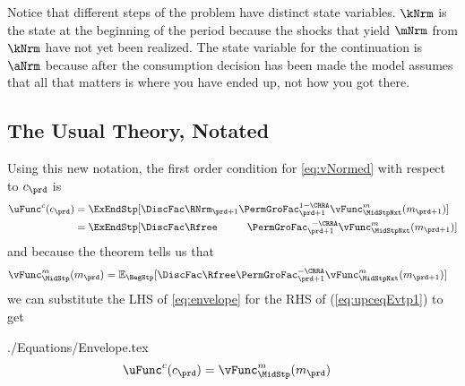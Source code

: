 \documentclass[SolvingMicroDSOPs]{subfiles}
\begin{document}
Notice that different steps of the problem have distinct state variables.  $\kNrm$ is the state at the beginning of the period because the shocks that yield $\mNrm$ from $\kNrm$ have not yet been realized. The state variable for the continuation {\move} is $\aNrm$ because after the consumption decision has been made the model assumes that all that matters is where you have ended up, not how you got there.

\subsection{The Usual Theory, Notated}

Using this new notation, the first order condition for \eqref{eq:vNormed} with respect to ${c}_{\prd}$ is
\begin{equation}\begin{gathered}\begin{aligned}
      \uFunc^{{c}}({c}_{\prd})  & = \ExEndStp[\DiscFac \RNrm_{\prd+1}\PermGroFac_{\prd+1}^{1-\CRRA}{\vFunc}^{{m}}_{\MidStpNxt}({m}_{\prd+1})]  \label{eq:upceqEvtp1}
      \\                        & =  \ExEndStp[\DiscFac\Rfree\phantom{._{\prd+1}}\PermGroFac_{\prd+1}^{\phantom{1}-\CRRA}{\vFunc}^{{m}}_{\MidStpNxt}({m}_{\prd+1})]
    \end{aligned}\end{gathered}\end{equation}
and because the  theorem tells us that
\begin{equation}\begin{gathered}\begin{aligned}
      {\vFunc}^{{m}}_{\MidStp}({m}_{\prd})  & =  \Ex_{\BegStp} [\DiscFac\Rfree\PermGroFac_{\prd+1}^{-\CRRA}{\vFunc}^{{m}}_{\MidStpNxt}({m}_{\prd+1})] \label{eq:envelope}
    \end{aligned}\end{gathered}\end{equation}
we can substitute the LHS of \eqref{eq:envelope} for the RHS of
(\ref{eq:upceqEvtp1}) to get
\begin{verbatimwrite}{./Equations/Envelope.tex}
  \begin{equation}\begin{gathered}\begin{aligned}
        \uFunc^{{c}}({c}_{\prd})  & = {\vFunc}^{{m}}_{\MidStp}({m}_{\prd})\label{eq:upcteqvtp}
      \end{aligned}\end{gathered}\end{equation}
\end{verbatimwrite}
\end{document}
